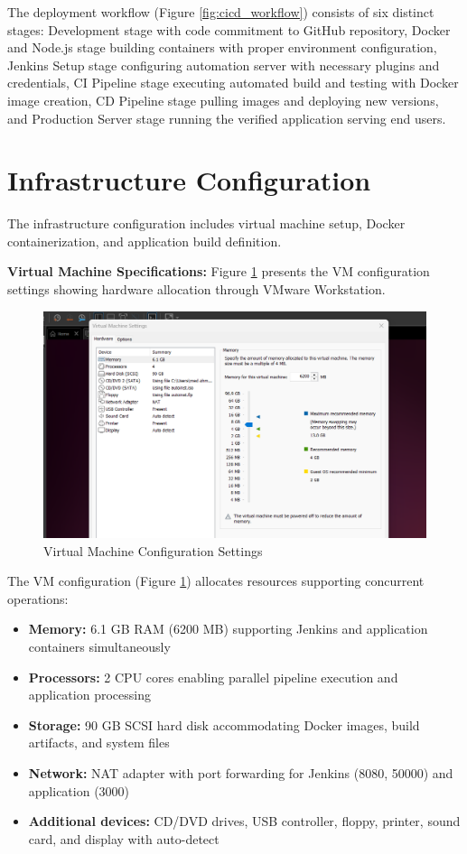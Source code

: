 The deployment workflow (Figure \ref{fig:cicd_workflow}) consists of six distinct stages: Development stage with code commitment to GitHub repository, Docker and Node.js stage building containers with proper environment configuration, Jenkins Setup stage configuring automation server with necessary plugins and credentials, CI Pipeline stage executing automated build and testing with Docker image creation, CD Pipeline stage pulling images and deploying new versions, and Production Server stage running the verified application serving end users.

\section{Infrastructure Configuration}

The infrastructure configuration includes virtual machine setup, Docker containerization, and application build definition.

\textbf{Virtual Machine Specifications:} Figure \ref{fig:vm_config} presents the VM configuration settings showing hardware allocation through VMware Workstation.

\begin{figure}[H]
    \centering
    \includegraphics[width=0.85\linewidth]{img/chap_08/vm_config.png}
    \caption{Virtual Machine Configuration Settings}
    \label{fig:vm_config}
\end{figure}

The VM configuration (Figure \ref{fig:vm_config}) allocates resources supporting concurrent operations:
\begin{itemize}
\item \textbf{Memory:} 6.1 GB RAM (6200 MB) supporting Jenkins and application containers simultaneously
\item \textbf{Processors:} 2 CPU cores enabling parallel pipeline execution and application processing
\item \textbf{Storage:} 90 GB SCSI hard disk accommodating Docker images, build artifacts, and system files
\item \textbf{Network:} NAT adapter with port forwarding for Jenkins (8080, 50000) and application (3000)
\item \textbf{Additional devices:} CD/DVD drives, USB controller, floppy, printer, sound card, and display with auto-detect
\end{itemize}

